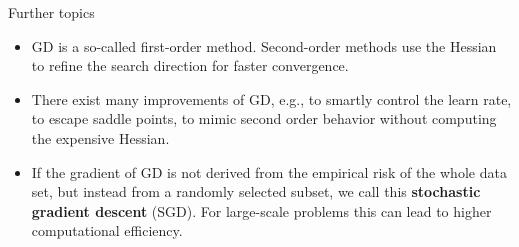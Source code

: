 \documentclass[11pt,compress,t,notes=noshow, xcolor=table]{beamer}
\begin{document}
\begin{vbframe}{Further topics}
\begin{itemize}
\item GD is a so-called first-order method. Second-order methods use the Hessian to refine the search direction for faster convergence.
\item There exist many improvements of GD, e.g., to smartly control the learn rate, to escape saddle points, to mimic second order behavior without computing the expensive Hessian.
\item If the gradient of GD is not derived from the empirical risk of the whole data set, but instead from a randomly selected subset, we call this \textbf{stochastic gradient descent} (SGD). For large-scale problems this can lead to higher computational efficiency.
\end{itemize}
\end{vbframe}




\endlecture
\end{document}
